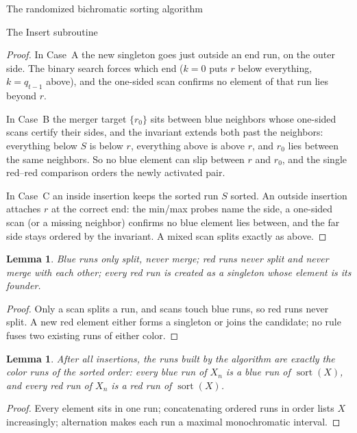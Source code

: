 \documentclass[11pt]{article}
\newtheorem{lem}[thm]{Lemma}
\theoremstyle{definition}
\numberwithin{equation}{section}
\begin{document}
\begin{section}{The randomized bichromatic sorting algorithm}
\begin{subsection}{The {\ttfamily Insert} subroutine}
\begin{aiblock}
\begin{proof}
In Case~A the new singleton goes just outside an end run, on the
outer side. The binary search forces which end ($k = 0$ puts $r$
below everything, $k = q_{t-1}$ above), and the one-sided scan
confirms no element of that run lies beyond $r$.

In Case~B the merger target $\{r_0\}$ sits between blue neighbors
whose one-sided scans certify their sides, and the invariant
extends both past the neighbors: everything below $S$ is below
$r$, everything above is above $r$, and $r_0$ lies between the
same neighbors. So no blue element can slip between $r$ and $r_0$,
and the single red--red comparison orders the newly activated pair.

In Case~C an inside insertion keeps the sorted run $S$ sorted. An
outside insertion attaches $r$ at the correct end: the
min/max probes name the side, a one-sided scan (or a missing neighbor) confirms no blue element lies between, and the far side stays ordered by
the invariant. A mixed scan splits exactly as above.
\end{proof}

\begin{lem}\label{lem:evolution}
Blue runs only split, never merge; red runs never split and
never merge with each other; every red run is created as a
singleton whose element is its {\em founder}.
\end{lem}
\begin{proof}
Only a scan splits a run, and scans touch blue runs, so red
runs never split. A new red element either forms a singleton or joins the
candidate; no rule fuses two existing runs of either color.
\end{proof}

\begin{lem}\label{lem:finalruns}
After all insertions, the runs built by the algorithm are exactly
the color runs of the sorted order: every blue run of $X_n$ is a
blue run of $\operatorname{sort}(X)$, and every red run of $X_n$ is
a red run of $\operatorname{sort}(X)$.
\end{lem}
\begin{proof}
Every element sits in one run; concatenating ordered runs in
order lists $X$ increasingly; alternation makes each run a
maximal monochromatic interval.
\end{proof}

\end{aiblock}

\end{subsection}



\end{section}
\end{document}
